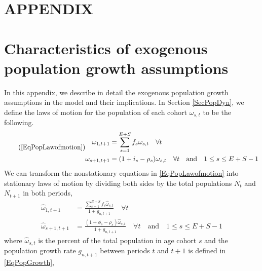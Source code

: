 \documentclass[letterpaper,12pt]{article}
\theoremstyle{definition}
\begin{document}
\section*{APPENDIX}                              %

\section{Characteristics of exogenous population growth assumptions}\label{AppPopGrowth}

  In this appendix, we describe in detail the exogenous population growth assumptions in the model and their implications. In Section \ref{SecPopDyn}, we define the laws of motion for the population of each cohort $\omega_{s,t}$ to be the following.
  \begin{equation}\tag{\ref{EqPopLawofmotion}}
    \begin{split}
      \omega_{1,t+1} &= \sum_{s=1}^{E+S} f_s\omega_{s,t}\quad\forall t \\
        \omega_{s+1,t+1} &= (1 + i_s - \rho_s)\omega_{s,t}\quad\forall t\quad\text{and}\quad 1\leq s \leq E+S-1
    \end{split}
  \end{equation}
  We can transform the nonstationary equations in \eqref{EqPopLawofmotion} into stationary laws of motion by dividing both sides by the total populations $N_t$ and $N_{t+1}$ in both periods,
  \begin{equation}\label{EqPopLawofmotionStat}
    \begin{split}
      \hat{\omega}_{1,t+1} &= \frac{\sum_{s=1}^{E+S} f_s\hat{\omega}_{s,t}}{1+g_{n,t+1}}\quad\forall t \\
      \hat{\omega}_{s+1,t+1} &= \frac{(1 + \phi_s - \rho_s)\hat{\omega}_{s,t}}{1+g_{n,t+1}}\quad\forall t\quad\text{and}\quad 1\leq s \leq E+S-1
    \end{split}
  \end{equation}
  where $\hat{\omega}_{s,t}$ is the percent of the total population in age cohort $s$ and the population growth rate $g_{n,t+1}$ between periods $t$ and $t+1$ is defined in \eqref{EqPopGrowth},
\end{document}
